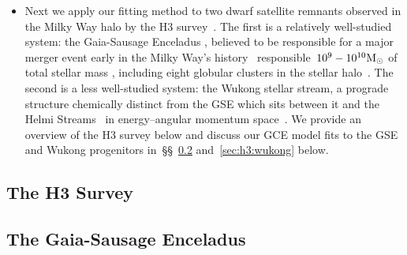 \documentclass[ms.tex]{subfiles}
\begin{document}
\begin{itemize}

	\item Next we apply our fitting method to two dwarf satellite remnants
	observed in the Milky Way halo by the H3 survey~\citep[survey design:
	][]{Conroy2019}.
	The first is a relatively well-studied system: the Gaia-Sausage Enceladus
	\citep[GSE;][]{Belokurov2018, Helmi2018}, believed to be responsible for
	a major merger event early in the Milky Way's history~\citep{Chaplin2020}
	responsible~$10^9 - 10^{10} \text{M}_\odot$ of total stellar mass
	\citep{Deason2019, Fattahi2019, Mackereth2019, Vincenzo2019}, including
	eight globular clusters in the stellar halo~\citep{Myeong2018}.
	The second is a less well-studied system: the Wukong stellar stream,
	a prograde structure chemically distinct from the GSE which sits between it
	and the Helmi Streams~\citep{Helmi1999} in energy--angular momentum
	space~\citep{Naidu2020, Naidu2022}.
	We provide an overview of the H3 survey below and discuss our GCE model
	fits to the GSE and Wukong progenitors in~\S\S~\ref{sec:h3:gse}
	and~\ref{sec:h3:wukong} below.

\end{itemize}

\subsection{The H3 Survey}
\label{sec:h3:survey}

\subsection{The Gaia-Sausage Enceladus}
\label{sec:h3:gse}
\end{document}
